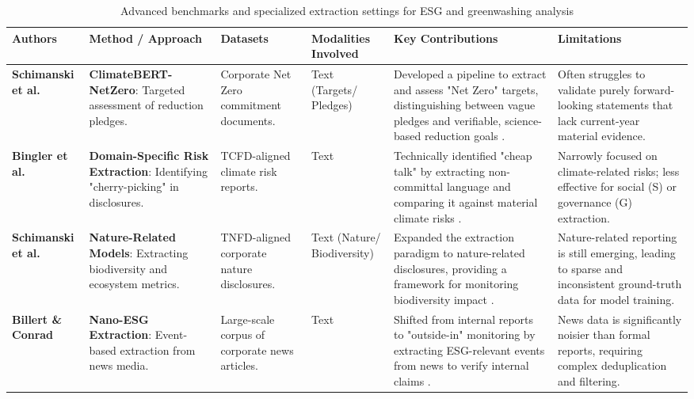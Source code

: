 \begin{landscape}
\begin{table}[p]
\centering
\caption{Advanced benchmarks and specialized extraction settings for ESG and greenwashing analysis}
\label{tab:advanced-esg-greenwashing-benchmarks}
\small
\renewcommand{\arraystretch}{1.2}
\begin{tabularx}{\linewidth}{|p{1.8cm}|p{3.5cm}|p{2.5cm}|p{1.8cm}|X|X|}
\hline
Authors & Method / Approach & Datasets & Modalities Involved & Key Contributions & Limitations \\ \hline
\textbf{Schimanski et al.}  \parencite{tobias_schimanski_241ada20} & \textbf{ClimateBERT-NetZero}: Targeted assessment of reduction pledges. & Corporate Net Zero commitment documents. & Text (Targets/ Pledges) & Developed a pipeline to extract and assess "Net Zero" targets, distinguishing between vague pledges and verifiable, science-based reduction goals  \parencite{tobias_schimanski_241ada20}. & Often struggles to validate purely forward-looking statements that lack current-year material evidence. \\ \hline
\textbf{Bingler et al.}  \parencite{julia_bingler_268445e3} & \textbf{Domain-Specific Risk Extraction}: Identifying "cherry-picking" in disclosures. & TCFD-aligned climate risk reports. & Text & Technically identified "cheap talk" by extracting non-committal language and comparing it against material climate risks  \parencite{julia_bingler_268445e3}. & Narrowly focused on climate-related risks; less effective for social (S) or governance (G) extraction. \\ \hline
\textbf{Schimanski et al.}  \parencite{tobias_schimanski_3549ff9f} & \textbf{Nature-Related Models}: Extracting biodiversity and ecosystem metrics. & TNFD-aligned corporate nature disclosures. & Text (Nature/ Biodiversity) & Expanded the extraction paradigm to nature-related disclosures, providing a framework for monitoring biodiversity impact  \parencite{tobias_schimanski_3549ff9f}. & Nature-related reporting is still emerging, leading to sparse and inconsistent ground-truth data for model training. \\ \hline
\textbf{Billert \& Conrad}  \parencite{fabian_billert_a5fbb687} & \textbf{Nano-ESG Extraction}: Event-based extraction from news media. & Large-scale corpus of corporate news articles. & Text & Shifted from internal reports to "outside-in" monitoring by extracting ESG-relevant events from news to verify internal claims  \parencite{fabian_billert_a5fbb687}. & News data is significantly noisier than formal reports, requiring complex deduplication and filtering. \\ \hline

\end{tabularx}
\end{table}
\end{landscape}
